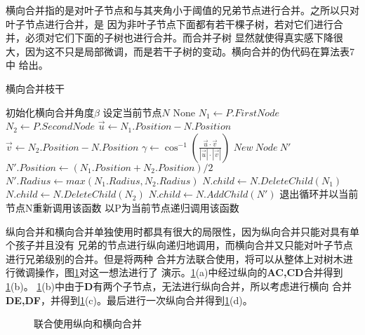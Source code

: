 横向合并指的是对叶子节点和与其夹角小于阈值的兄弟节点进行合并。之所以只对叶子节点进行合并，是
因为非叶子节点下面都有若干棵子树，若对它们进行合并，必须对它们下面的子树也进行合并。而合并子树
显然就使得真实感下降很大，因为这不只是局部微调，而是若干子树的变动。横向合并的伪代码在算法表7中
给出。

\begin{algorithm}[H]
	\caption{横向合并枝干}
\begin{algorithmic}[1]
	\Require 初始化横向合并角度$\beta$
	\Require 设定当前节点$N$
	\Ensure None
		\State $N_1 \gets P.FirstNode$
		\State $N_2 \gets P.SecondNode$
			\State $\vec{u} \gets N_1.Position - N.Position$
			\State $\vec{v} \gets N_2.Position - N.Position$
			\State $\gamma \gets \cos^{-1}({\frac{\vec{u} \cdot \vec{v}}{|\vec{u}|\cdot|\vec{v}|}})$
			\If{$\gamma<\beta$}
				\State $New\ Node\ N'$
				\State $N'.Position \gets (N_1.Position+N_2.Position)/2$
				\State $N'.Radius \gets max(N_1.Radius,N_2.Radius)$
				\State $N.child \gets N.DeleteChild(N_1)$
				\State $N.child \gets N.DeleteChild(N_2)$
				\State $N.child \gets N.AddChild(N')$
				\State 退出循环并以当前节点N重新调用该函数
			\EndIf
		\EndIf
	\EndFor
		\State 以P为当前节点递归调用该函数
	\EndFor
\end{algorithmic}
\end{algorithm}

纵向合并和横向合并单独使用时都具有很大的局限性，因为纵向合并只能对具有单个孩子并且没有
兄弟的节点进行纵向递归地调用，而横向合并又只能对叶子节点进行兄弟级别的合并。但是将两种
合并方法联合使用，将可以从整体上对树木进行微调操作，图\ref{fig:combine}对这一想法进行了
演示。\ref{fig:combine}(a)中经过纵向的\textbf{AC,CD}合并得到\ref{fig:combine}(b)。
\ref{fig:combine}(b)中由于\textbf{D}有两个子节点，无法进行纵向合并，所以考虑进行横向
合并\textbf{DE,DF}，并得到\ref{fig:combine}(c)。最后进行一次纵向合并得到\ref{fig:combine}(d)。

\begin{figure}[H]
	\centering
	\hspace{4em}
	\hspace{4em}
	\hspace{4em}
	\caption{联合使用纵向和横向合并}
	\label{fig:combine}
\end{figure}

